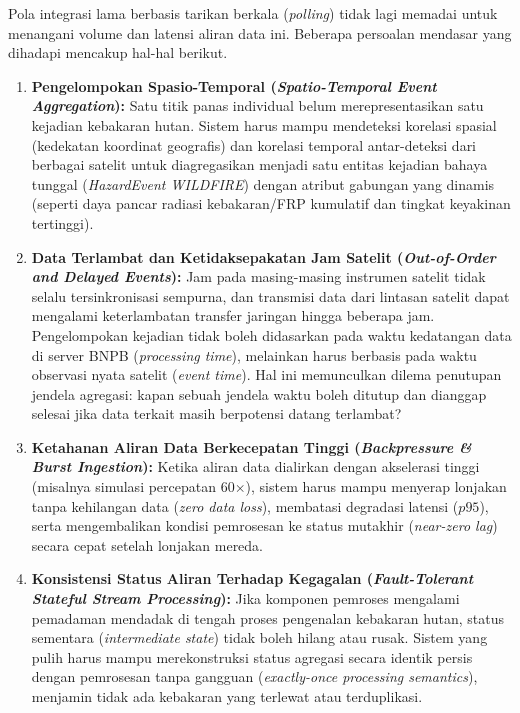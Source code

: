 \noindent Pola integrasi lama berbasis tarikan berkala (\textit{polling}) tidak lagi memadai untuk menangani volume dan latensi aliran data ini. Beberapa persoalan mendasar yang dihadapi mencakup hal-hal berikut.
\begin{enumerate}
    \item \textbf{Pengelompokan Spasio-Temporal (\textit{Spatio-Temporal Event Aggregation}):} Satu titik panas individual belum merepresentasikan satu kejadian kebakaran hutan. Sistem harus mampu mendeteksi korelasi spasial (kedekatan koordinat geografis) dan korelasi temporal antar-deteksi dari berbagai satelit untuk diagregasikan menjadi satu entitas kejadian bahaya tunggal (\textit{HazardEvent WILDFIRE}) dengan atribut gabungan yang dinamis (seperti daya pancar radiasi kebakaran/FRP kumulatif dan tingkat keyakinan tertinggi).
    \item \textbf{Data Terlambat dan Ketidaksepakatan Jam Satelit (\textit{Out-of-Order and Delayed Events}):} Jam pada masing-masing instrumen satelit tidak selalu tersinkronisasi sempurna, dan transmisi data dari lintasan satelit dapat mengalami keterlambatan transfer jaringan hingga beberapa jam. Pengelompokan kejadian tidak boleh didasarkan pada waktu kedatangan data di server BNPB (\textit{processing time}), melainkan harus berbasis pada waktu observasi nyata satelit (\textit{event time}). Hal ini memunculkan dilema penutupan jendela agregasi: kapan sebuah jendela waktu boleh ditutup dan dianggap selesai jika data terkait masih berpotensi datang terlambat?
    \item \textbf{Ketahanan Aliran Data Berkecepatan Tinggi (\textit{Backpressure \& Burst Ingestion}):} Ketika aliran data dialirkan dengan akselerasi tinggi (misalnya simulasi percepatan 60$\times$), sistem harus mampu menyerap lonjakan tanpa kehilangan data (\textit{zero data loss}), membatasi degradasi latensi ($p95$), serta mengembalikan kondisi pemrosesan ke status mutakhir (\textit{near-zero lag}) secara cepat setelah lonjakan mereda.
    \item \textbf{Konsistensi Status Aliran Terhadap Kegagalan (\textit{Fault-Tolerant Stateful Stream Processing}):} Jika komponen pemroses mengalami pemadaman mendadak di tengah proses pengenalan kebakaran hutan, status sementara (\textit{intermediate state}) tidak boleh hilang atau rusak. Sistem yang pulih harus mampu merekonstruksi status agregasi secara identik persis dengan pemrosesan tanpa gangguan (\textit{exactly-once processing semantics}), menjamin tidak ada kebakaran yang terlewat atau terduplikasi.
\end{enumerate}

